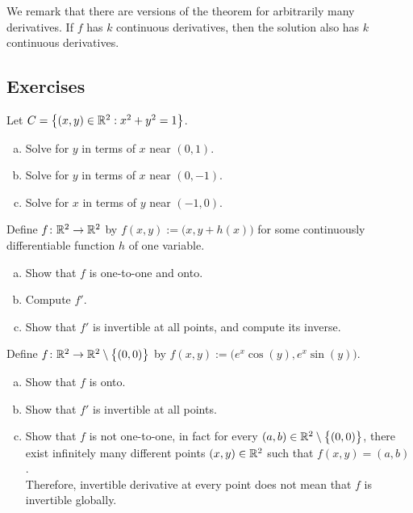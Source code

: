 We remark that there are versions of the theorem for arbitrarily many derivatives.
If $f$ has $k$ continuous derivatives, then the solution also has $k$
continuous derivatives.


\subsection{Exercises}

\begin{exercise}
Let $C = \bigl\{ (x,y) \in {\mathbb{R}}^2 : x^2+y^2 = 1 \bigr\}$.
\begin{enumerate}[a)]
\item
Solve for $y$ in terms of $x$ near $(0,1)$.
\item
Solve for $y$ in terms of $x$ near $(0,-1)$.
\item
Solve for $x$ in terms of $y$ near $(-1,0)$.
\end{enumerate}
\end{exercise}

\begin{exercise}
Define $f \colon {\mathbb{R}}^2 \to {\mathbb{R}}^2$ by $f(x,y) :=
\bigl(x,y+h(x)\bigr)$ for some continuously differentiable function $h$ of one
variable.
\begin{enumerate}[a)]
\item
Show that $f$ is one-to-one and onto.
\item
Compute $f'$.
\item
Show that $f'$ is invertible at all points, and compute
its inverse.
\end{enumerate}
\end{exercise}

\begin{exercise}
Define $f \colon {\mathbb{R}}^2 \to {\mathbb{R}}^2 \setminus \bigl\{ (0,0) \bigr\}$ by $f(x,y) :=
\bigl(e^x\cos(y),e^x\sin(y)\bigr)$.
\begin{enumerate}[a)]
\item
Show that $f$ is onto.
\item
Show that $f'$ is invertible at all points.
\item
Show that $f$ is not one-to-one, in fact for every $(a,b) \in {\mathbb{R}}^2
\setminus \bigl\{ (0,0) \bigr\}$,
there exist infinitely many different points $(x,y) \in {\mathbb{R}}^2$ such that 
$f(x,y) = (a,b)$.\\
Therefore, invertible derivative at every point does not mean that
$f$ is invertible globally.
\end{enumerate}
\end{exercise}


